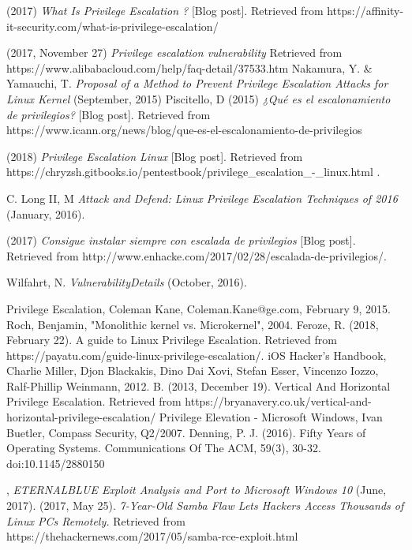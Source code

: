 \documentclass[letterpaper, 10pt, journal]{IEEEtran}
\begin{document}
\begin{thebibliography}{1}
 (2017) \emph{What Is Privilege Escalation ?} [Blog post]. Retrieved from https://affinity-it-security.com/what-is-privilege-escalation/

 (2017, November 27) \emph{Privilege escalation vulnerability} Retrieved from https://www.alibabacloud.com/help/faq-detail/37533.htm
 Nakamura, Y. \& Yamauchi, T. \emph{Proposal of a Method to Prevent Privilege Escalation Attacks for Linux Kernel} (September, 2015)
 Piscitello, D (2015) \emph{¿Qu\'e es el escalonamiento de privilegios?} [Blog post]. Retrieved from https://www.icann.org/news/blog/que-es-el-escalonamiento-de-privilegios

 (2018) \emph{Privilege Escalation Linux} [Blog post]. Retrieved from https://chryzsh.gitbooks.io/pentestbook/privilege\_escalation\_-\_linux.html .

 C. Long II, M \emph{Attack and Defend: Linux Privilege Escalation Techniques of 2016} (January, 2016).

 (2017) \emph{Consigue instalar siempre con escalada de privilegios} [Blog post]. Retrieved from http://www.enhacke.com/2017/02/28/escalada-de-privilegios/.

 Wilfahrt, N. \emph{VulnerabilityDetails} (October, 2016).

\bibitem{[11]} Privilege Escalation, Coleman Kane, Coleman.Kane@ge.com, February 9, 2015.
\bibitem{[2]} Roch, Benjamin, "Monolithic kernel vs. Microkernel", 2004.
\bibitem{[3]} Feroze, R. (2018, February 22). A guide to Linux Privilege Escalation. Retrieved from https://payatu.com/guide-linux-privilege-escalation/.
\bibitem{[4]} iOS Hacker’s Handbook, Charlie Miller, Djon Blackakis, Dino Dai Xovi, Stefan Esser, Vincenzo Iozzo, Ralf-Phillip Weinmann, 2012.
\bibitem{[5]} B. (2013, December 19). Vertical And Horizontal Privilege Escalation. Retrieved from https://bryanavery.co.uk/vertical-and-horizontal-privilege-escalation/ 
\bibitem{[6]} Privilege Elevation - Microsoft Windows, Ivan Buetler, Compass Security, Q2/2007.
Denning, P. J. (2016). Fifty Years of Operating Systems. Communications Of The ACM, 59(3), 30-32. doi:10.1145/2880150

, \emph{ETERNALBLUE Exploit Analysis and Port to Microsoft Windows 10} (June, 2017).
 (2017, May 25). \emph{7-Year-Old Samba Flaw Lets Hackers Access Thousands of Linux PCs Remotely.} Retrieved from https://thehackernews.com/2017/05/samba-rce-exploit.html 


\end{thebibliography}
\end{document}
